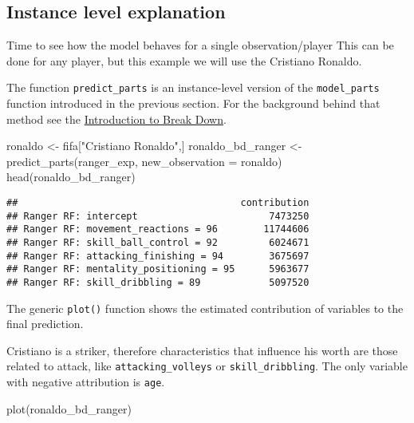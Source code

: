 \documentclass[
]{scrbook}
\newenvironment{Shaded}{\begin{snugshade}}{\end{snugshade}}
\newcommand{\AttributeTok}[1]{\textcolor[rgb]{0.77,0.63,0.00}{#1}}
\newcommand{\FunctionTok}[1]{\textcolor[rgb]{0.00,0.00,0.00}{#1}}
\newcommand{\NormalTok}[1]{#1}
\newcommand{\OtherTok}[1]{\textcolor[rgb]{0.56,0.35,0.01}{#1}}
\newcommand{\StringTok}[1]{\textcolor[rgb]{0.31,0.60,0.02}{#1}}
\renewenvironment{Shaded} {\begin{snugshade}\small} {\end{snugshade}}
\begin{document}
\hypertarget{interpretability-instance-level}{%
\subsection{Instance level explanation}\label{interpretability-instance-level}}

Time to see how the model behaves for a single observation/player
This can be done for any player, but this example we will use the Cristiano Ronaldo.

The function \texttt{predict\_parts} is an instance-level version of the \texttt{model\_parts} function introduced in the previous section. For the background behind that method see the \href{https://pbiecek.github.io/ema/breakDown.html}{Introduction to Break Down}.

\begin{Shaded}
\begin{Highlighting}[]
\NormalTok{ronaldo }\OtherTok{\textless{}{-}}\NormalTok{ fifa[}\StringTok{"Cristiano Ronaldo"}\NormalTok{,]}
\NormalTok{ronaldo\_bd\_ranger }\OtherTok{\textless{}{-}} \FunctionTok{predict\_parts}\NormalTok{(ranger\_exp,}
                        \AttributeTok{new\_observation =}\NormalTok{ ronaldo)}
\FunctionTok{head}\NormalTok{(ronaldo\_bd\_ranger)}
\end{Highlighting}
\end{Shaded}

\begin{verbatim}
##                                       contribution
## Ranger RF: intercept                       7473250
## Ranger RF: movement_reactions = 96        11744606
## Ranger RF: skill_ball_control = 92         6024671
## Ranger RF: attacking_finishing = 94        3675697
## Ranger RF: mentality_positioning = 95      5963677
## Ranger RF: skill_dribbling = 89            5097520
\end{verbatim}

The generic \texttt{plot()} function shows the estimated contribution of variables to the final prediction.

Cristiano is a striker, therefore characteristics that influence his worth are those related to attack, like \texttt{attacking\_volleys} or \texttt{skill\_dribbling}. The only variable with negative attribution is \texttt{age}.

\begin{Shaded}
\begin{Highlighting}[]
\FunctionTok{plot}\NormalTok{(ronaldo\_bd\_ranger)}
\end{Highlighting}
\end{Shaded}
\end{document}
